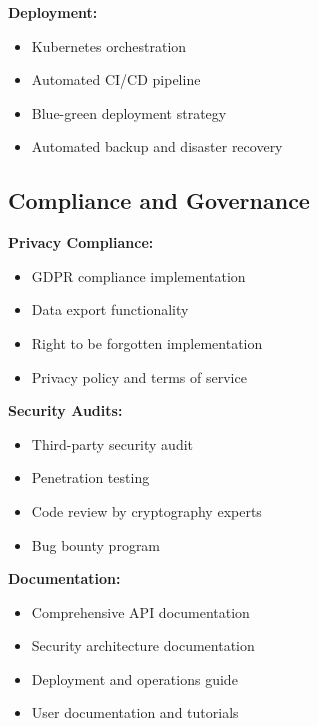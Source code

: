 \textbf{Deployment:}
\begin{itemize}
    \item Kubernetes orchestration
    \item Automated CI/CD pipeline
    \item Blue-green deployment strategy
    \item Automated backup and disaster recovery
\end{itemize}

\subsection{Compliance and Governance}

\textbf{Privacy Compliance:}
\begin{itemize}
    \item GDPR compliance implementation
    \item Data export functionality
    \item Right to be forgotten implementation
    \item Privacy policy and terms of service
\end{itemize}

\textbf{Security Audits:}
\begin{itemize}
    \item Third-party security audit
    \item Penetration testing
    \item Code review by cryptography experts
    \item Bug bounty program
\end{itemize}

\textbf{Documentation:}
\begin{itemize}
    \item Comprehensive API documentation
    \item Security architecture documentation
    \item Deployment and operations guide
    \item User documentation and tutorials
\end{itemize}


